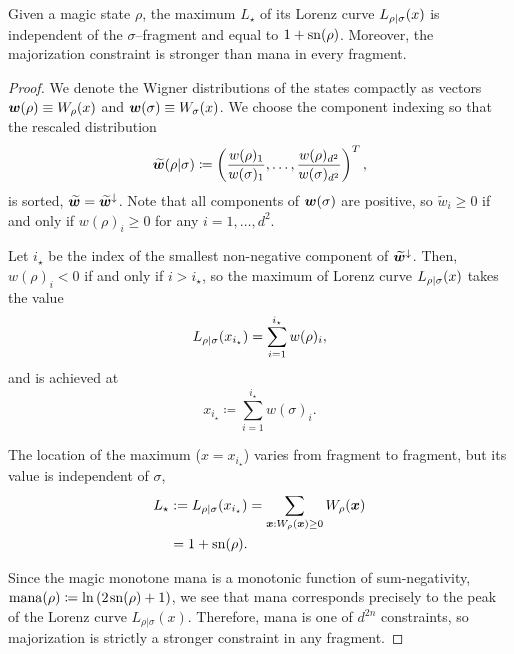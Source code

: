 \begin{lemma}\label{lem:lcmax}
	Given a magic state $\rho$, the maximum $L_\star$ of its Lorenz curve ${L_{\rho|\sigma}}(x)$ is independent of the $\sigma$--fragment and equal to $1+{{\rm{sn}}(\rho)}$. Moreover, the majorization constraint is stronger than mana in every fragment.
\end{lemma}
\begin{proof}
	We denote the Wigner distributions of the states compactly as vectors $\bm{w}(\rho) \equiv W_\rho(x)$ and $\bm{w}(\sigma) \equiv W_\sigma(x)$.
	We choose the component indexing so that the rescaled distribution 
	\begin{equation}
		\widetilde{\bm{w}}(\rho|\sigma) \coloneqq \left(\frac{w(\rho)_1}{w(\sigma)_1}, \dots, \frac{w(\rho)_{d^2}}{w(\sigma)_{d^2}} \right)^T,
	\end{equation}
	is sorted, $\widetilde{\bm{w}} = \widetilde{\bm{w}}^\downarrow$.
	Note that all components of $\bm{w}(\sigma)$ are positive, so $\widetilde{w}_i \geq 0$ if and only if $w(\rho)_i \geq 0$ for any $i=1,\dots,d^2$.
	
	Let $i_\star$ be the index of the smallest non-negative component of $\widetilde{\bm{w}}^\downarrow$.
	Then, $w(\rho)_i < 0$ if and only if $i > i_\star$, so the maximum of Lorenz curve ${L_{\rho|\sigma}}(x)$ takes the value 
	\begin{equation}
		{L_{\rho|\sigma}}(x_{i_\star}) = \sum_{i=1}^{i_\star} w(\rho)_i,
	\end{equation}
	and is achieved at
	\begin{equation}\label{eq:maxloc}
		x_{i_\star} \coloneqq \sum_{i=1}^{i_\star} w(\sigma)_i.
	\end{equation}

	The location of the maximum ($x=x_{i_\star}$) varies from fragment to fragment, but its value is independent of $\sigma$,
	\begin{align}
	L_\star &:=	\lc{\rho}{\sigma}(x_{i_\star}) 
		= \sum\limits_{\bmx: \W[\bmx]{\rho} \geq 0} \W[\bmx]{\rho} \nonumber \\
		&= 1 + \sn{\rho}.
	\end{align}
	
Since the magic monotone mana is a monotonic function of sum-negativity, $\rm{mana}(\rho) \coloneqq \ln{(2\hspace{1pt} {{\rm{sn}}(\rho)} +1)}$, we see that mana corresponds precisely to the peak of the Lorenz curve $L_{\rho|\sigma}(x)$. Therefore, mana is one of $d^{2n}$ constraints, so majorization is strictly a stronger constraint in any fragment.
\end{proof}


